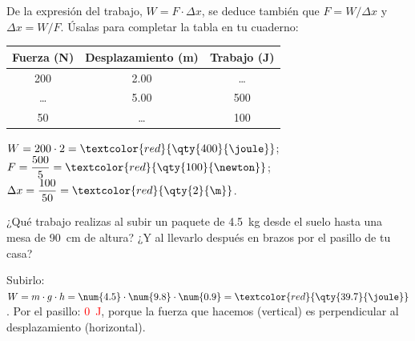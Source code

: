\begin{exercise}
    De la expresión del trabajo, \(W = F \cdot \Delta x\), se deduce también que \(F = W/\Delta x\) y \(\Delta x = W/F\). Úsalas para completar la tabla en tu cuaderno:
    \begin{center}
        \begin{tabular}{@{}ccc@{}}
            \toprule
            \textbf{Fuerza (N)} & \textbf{Desplazamiento (m)} & \textbf{Trabajo (J)} \\
            \midrule
            200 & \num{2.00} & \ldots \\[3pt]
            \ldots & \num{5.00} & 500 \\[3pt]
            50 & \ldots & 100 \\
            \bottomrule
        \end{tabular}
    \end{center}
    \begin{solu}
        \(W = 200 \cdot 2 = \textcolor{red}{\qty{400}{\joule}}\); \(F = \dfrac{500}{5} = \textcolor{red}{\qty{100}{\newton}}\); \(\Delta x = \dfrac{100}{50} = \textcolor{red}{\qty{2}{\m}}\).
    \end{solu}
\end{exercise}

\begin{exercise}
    ¿Qué trabajo realizas al subir un paquete de \qty{4.5}{\kg} desde el suelo hasta una mesa de \qty{90}{\cm} de altura? ¿Y al llevarlo después en brazos por el pasillo de tu casa?
    \begin{solu}
        Subirlo: \(W = m \cdot g \cdot h = \num{4.5} \cdot \num{9.8} \cdot \num{0.9} = \textcolor{red}{\qty{39.7}{\joule}}\). Por el pasillo: \textcolor{red}{\qty{0}{\joule}}, porque la fuerza que hacemos (vertical) es perpendicular al desplazamiento (horizontal).
    \end{solu}
\end{exercise}

